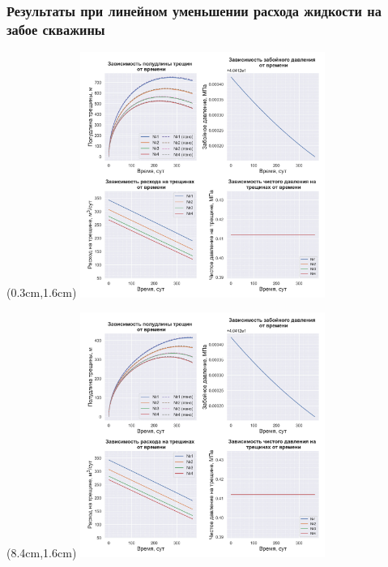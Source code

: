 \documentclass{beamer}
\begin{document}
\begin{frame}
\frametitle{Результаты при линейном уменьшении расхода жидкости на забое скважины}

\begin{textblock*}{8cm}(0.3cm,1.6cm)
\includegraphics[width=8cm]{myimage5.jpg}
\end{textblock*}

\begin{textblock*}{8cm}(8.4cm,1.6cm)
%
  {\includegraphics[width=8cm]{myimage6.jpg}}
\end{textblock*}

\end{frame}
\end{document}
